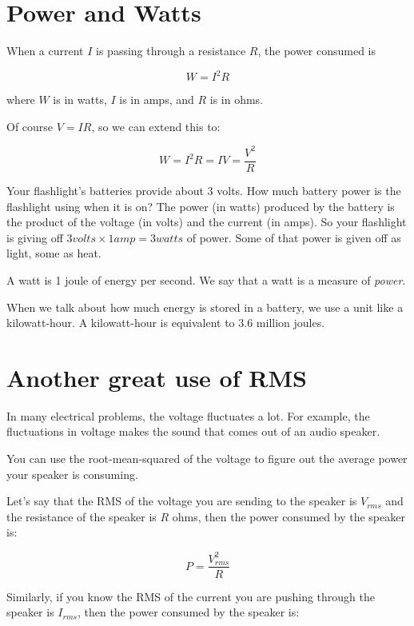 \section{Power and Watts}

\begin{mdframed}[style=important, frametitle={Joule's Law}]

  When a current $I$ is passing through a resistance $R$, the power consumed is
  
  $$W = I^2 R$$

  where $W$ is in watts, $I$ is in amps, and $R$ is in ohms.
\end{mdframed}

Of course $V = IR$, so we can extend this to:

$$W = I^2 R = I V = \frac{V^2}{R}$$

Your flashlight's batteries provide about 3 volts. How much
battery power is the flashlight using when it is on? The power (in
watts) produced by the battery is the product of the voltage (in
volts) and the current (in amps). So your flashlight is giving off $3
volts \times 1 amp = 3 watts$ of power. Some of that power is given
off as light, some as heat.

A watt is 1 joule of energy per second. We say that a watt is a
measure of \textit{power}.

When we talk about how much energy is stored in a battery, we use a
unit like a kilowatt-hour. A kilowatt-hour is equivalent to 3.6 million
joules.

\section{Another great use of RMS}

In many electrical problems, the voltage fluctuates a lot.  For
example, the fluctuations in voltage makes the sound that comes out of an
audio speaker.

You can use the root-mean-squared of the voltage to figure out the average power
your speaker is consuming.

Let's say that the RMS of the voltage you are sending to the speaker is $V_{rms}$
and the resistance of the speaker is $R$ ohms, then the power consumed
by the speaker is:

$$P = \frac{V_{rms}^2}{R}$$

Similarly, if you know the RMS of the current you are pushing through
the speaker is $I_{rms}$, then the power consumed by the speaker is:

